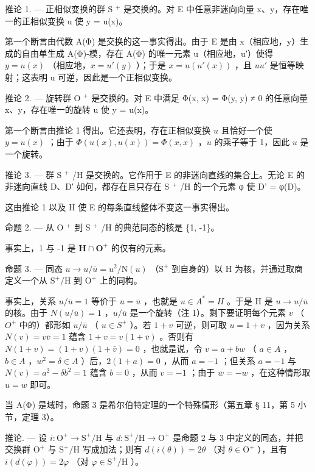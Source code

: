 推论 1. --- 正相似变换的群 S \(^{+}\) 是交换的。对 E 中任意非迷向向量 x、y，存在唯一的正相似变换 u 使 y = u(x)。

第一个断言由代数 A(Φ) 是交换的这一事实得出。由于 E 是由 x（相应地，y）生成的自由单生成 A(Φ)-模，存在 A(Φ) 的唯一元素 u（相应地，u′）使得 \(y = u(x)\) （相应地，\(x = u'(y)\) ）；于是 \(x = u(u'(x))\) ，且 \(uu'\) 是恒等映射；这表明 u 可逆，因此是一个正相似变换。

推论 2. --- 旋转群 O \(^{+}\) 是交换的。对 E 中满足 Φ(x, x) = Φ(y, y) ≠ 0 的任意向量 x、y，存在唯一的旋转 u 使 y = u(x)。

第一个断言由推论 1 得出。它还表明，存在正相似变换 \(u\) 且恰好一个使 \(y = u(x)\) ；由于 \(\Phi(u(x), u(x)) = \Phi(x, x)\) ，\(u\) 的乘子等于 1，因此 \(u\) 是一个旋转。

推论 3. --- 群 S \(^{+}\) /H 是交换的。它作用于 E 的非迷向直线的集合上。无论 E 的非迷向直线 D、D′ 如何，都存在且只存在 S \(^{+}\) /H 的一个元素 φ 使 D' = φ(D)。

这由推论 1 以及 H 使 E 的每条直线整体不变这一事实得出。

命题 2. --- 从 O \(^{+}\) 到 S \(^{+}\) /H 的典范同态的核是 \{1, -1\}。

事实上，1 与 -1 是 \(\mathbf{H} \cap \mathbf{O}^{+}\) 的仅有的元素。

命题 3. --- 同态 \(u \to u/\overline{u} = u^{2}/\mathrm{N}(u)\) （\(\mathrm{S}^{+}\) 到自身的）以 H 为核，并通过取商定义一个从 \(\mathrm{S}^{+}/\mathrm{H}\) 到 \(\mathrm{O}^{+}\) 上的同构。

事实上，关系 \(u/\overline{u} = 1\) 等价于 \(u = \overline{u}\) ，也就是 \(u \in A^* = H\) 。于是 H 是 \(u \to u/\overline{u}\) 的核。由于 \(N(u/\overline{u}) = 1\) ，\(u/\overline{u}\) 是一个旋转（注 1）。剩下要证明每个元素 \(v\) （\(O^+\) 中的）都形如 \(u/\overline{u}\) （ \(u \in S^+\) ）。若 \(1 + v\) 可逆，则可取 \(u = 1 + v\) ，因为关系 \(N(v) = v\bar{v} = 1\) 蕴含 \(1 + v = v(1 + \bar{v})\) 。否则有 \(N(1 + v) = (1 + v)(1 + \bar{v}) = 0\) ，也就是说，令 \(v = a + bw\) （ \(a \in A\) ，\(b \in A\) ，\(w^2 = \delta \in A\) ）后，\(2(1 + a) = 0\) ，从而 \(a = -1\) ；但关系 \(a = -1\) 与 \(N(v) = a^2 - \delta b^2 = 1\) 蕴含 \(b = 0\) ，从而 \(v = -1\) ；由于 \(\bar{w} = -w\) ，在这种情形取 \(u = w\) 即可。

当 A(Φ) 是域时，命题 3 是希尔伯特定理的一个特殊情形（第五章 § 11，第 5 小节，定理 3）。

推论. — 设 \(i: \mathrm{O}^{+} \to \mathrm{S}^{+}/\mathrm{H}\) 与 \(d: \mathrm{S}^{+}/\mathrm{H} \to \mathrm{O}^{+}\) 是命题 2 与 3 中定义的同态，并把交换群 \(\mathrm{O}^{+}\) 与 \(\mathrm{S}^{+}/\mathrm{H}\) 写成加法；则有 \(d(i(\theta)) = 2\theta\) （对 \(\theta \in \mathrm{O}^{+}\) ），且有 \(i(d(\varphi)) = 2\varphi\) （对 \(\varphi \in \mathrm{S}^{+}/\mathrm{H}\) ）。

